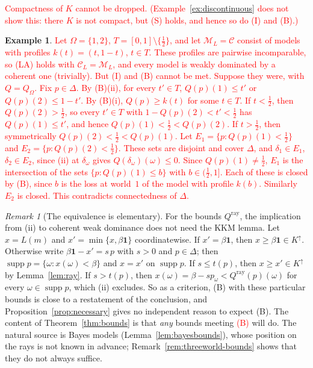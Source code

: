 \documentclass[11pt]{article}
\theoremstyle{definition}
\newtheorem{example}[theorem]{Example}
\theoremstyle{remark}
\newtheorem{remark}[theorem]{Remark}
\newcommand{\M}{\mathcal M}
\newcommand{\C}{\mathcal C}
\newcommand{\one}{\mathbf 1}
\newcommand{\supp}{\operatorname{supp}}
\begin{document}
\textcolor{red}{Compactness of $K$ cannot be dropped. (Example~\ref{ex:discontinuous} does not show this: there $K$ is not compact, but (S) holds, and hence so do (I) and (B).)}
\begin{example}\label{ex:hole}
\textcolor{red}{Let $\Omega=\{1,2\}$, $T=[0,1]\setminus\{\tfrac12\}$, and let $\M_L=\C$ consist of models with profiles $k(t)=(t,1-t)$, $t\in T$. These profiles are pairwise incomparable, so (LA) holds with $\C_L=\M_L$, and every model is weakly dominated by a coherent one (trivially). But (I) and (B) cannot be met. Suppose they were, with $Q=Q_\Omega$. Fix $p\in\Delta$. By (B)(ii), for every $t'\in T$, $Q(p)(1)\le t'$ or $Q(p)(2)\le 1-t'$. By (B)(i), $Q(p)\ge k(t)$ for some $t\in T$. If $t<\tfrac12$, then $Q(p)(2)>\tfrac12$, so every $t'\in T$ with $1-Q(p)(2)<t'<\tfrac12$ has $Q(p)(1)\le t'$, and hence $Q(p)(1)<\tfrac12<Q(p)(2)$. If $t>\tfrac12$, then symmetrically $Q(p)(2)<\tfrac12<Q(p)(1)$. Let $E_1=\{p:Q(p)(1)<\tfrac12\}$ and $E_2=\{p:Q(p)(2)<\tfrac12\}$. These sets are disjoint and cover $\Delta$, and $\delta_1\in E_1$, $\delta_2\in E_2$, since (ii) at $\delta_\omega$ gives $Q(\delta_\omega)(\omega)\le0$. Since $Q(p)(1)\ne\tfrac12$, $E_1$ is the intersection of the sets $\{p:Q(p)(1)\le b\}$ with $b\in(\tfrac12,1]$. Each of these is closed by (B), since $b$ is the loss at world~$1$ of the model with profile $k(b)$. Similarly $E_2$ is closed. This contradicts connectedness of $\Delta$.}
\end{example}

\begin{remark}[The equivalence is elementary]\label{rem:elementary}
For the bounds $Q^{\mathrm{ray}}$, the implication from (ii) to coherent weak dominance does not need the KKM lemma. Let $x=L(m)$ and $x'=\min\{x,\beta\one\}$ coordinatewise. If $x'=\beta\one$, then $x\ge \beta\one\in K^\uparrow$. Otherwise write $\beta\one-x'=s\,p$ with $s>0$ and $p\in\Delta$; then $\supp p=\{\omega:x(\omega)<\beta\}$ and $x=x'$ on $\supp p$. If $s\le t(p)$, then $x\ge x'\in K^\uparrow$ by Lemma~\ref{lem:ray}. If $s>t(p)$, then $x(\omega)=\beta-sp_\omega<Q^{\mathrm{ray}}(p)(\omega)$ for every $\omega\in\supp p$, which (ii) excludes. So as a criterion, (B) with these particular bounds is close to a restatement of the conclusion, and Proposition~\ref{prop:necessary} gives no independent reason to expect (B). The content of Theorem~\ref{thm:bounds} is that \emph{any} bounds meeting \textcolor{red}{(B)} will do. The natural source is Bayes models (Lemma~\ref{lem:bayesbounds}), whose position on the rays is not known in advance; Remark~\ref{rem:threeworld-bounds} shows that they do not always suffice.
\end{remark}
\end{document}

